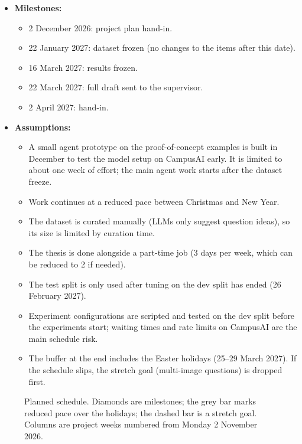 \documentclass[a4paper,11pt]{article}
\newif\ifshowsupervisorq
\newcommand{\supervisorq}[1]{%
  \ifshowsupervisorq
  \begin{supervisorqbox}#1
  \end{supervisorqbox}%
  \fi
}
\begin{document}
\begin{itemize}
  \item \textbf{Milestones:}
    \begin{itemize}
      \item 2 December 2026: project plan hand-in.
      \item 22 January 2027: dataset frozen (no changes to the items after
        this date).
      \item 16 March 2027: results frozen.
      \item 22 March 2027: full draft sent to the supervisor.
      \item 2 April 2027: hand-in.
    \end{itemize}
  \item \textbf{Assumptions:}
    \begin{itemize}
      \item A small agent prototype on the proof-of-concept examples is
        built in December to test the model setup on CampusAI early.
        It is limited to about one week of effort; the main agent work starts
        after the dataset freeze.
      \item Work continues at a reduced pace between Christmas and New Year.
      \item The dataset is curated manually (LLMs only suggest question
        ideas), so its size is limited by curation time.
      \item The thesis is done alongside a part-time job (3 days per week,
        which can be reduced to 2 if needed).
      \item The test split is only used after tuning on the dev split has
        ended (26 February 2027).
      \item Experiment configurations are scripted and tested on the dev
        split before the experiments start; waiting times and rate
        limits on CampusAI
        are the main schedule risk.
      \item The buffer at the end includes the Easter holidays (25--29 March
        2027). If the
        schedule slips, the stretch goal (multi-image questions) is dropped
        first.
    \end{itemize}
\end{itemize}

\supervisorq{Should the timeline cover the whole project period from the
  start (2 November 2026), or start after the hand-in of the project plan?
The current draft covers the whole period.}
\supervisorq{Do we know how much usage CampusAI gets? Could I run
into some limitations here?}

\begin{landscape}
  \begin{figure}[p]
    \centering
    
    \caption{Planned schedule. Diamonds are milestones; the grey bar marks
      reduced pace over the holidays; the dashed bar is a stretch goal.
    Columns are project weeks numbered from Monday 2 November 2026.}
    \label{fig:gantt} %
  \end{figure}
\end{landscape}
\end{document}
